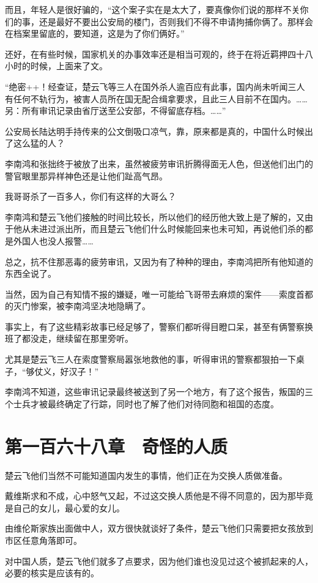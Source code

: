 而且，年轻人是很好骗的，“这个案子实在是太大了，要真像你们说的那样不关你们的事，还是最好不要出公安局的楼门，否则我们不得不申请拘捕你俩了。那样会在档案里留底的，要知道，这是为了你们俩好。”

还好，在有些时候，国家机关的办事效率还是相当可观的，终于在将近羁押四十八小时的时候，上面来了文。

“绝密++！经查证，楚云飞等三人在国外杀人逾百应有此事，国内尚未听闻三人有任何不轨行为，被害人员所在国无配合缉拿要求，且此三人目前不在国内。……另：所有审讯记录由省厅送至公安部，不得留底存档。……”

公安局长陆达明手持传来的公文倒吸口凉气，靠，原来都是真的，中国什么时候出了这么猛的人？

李南鸿和张拙终于被放了出来，虽然被疲劳审讯折腾得面无人色，但送他们出门的警官眼里那异样神色还是让他们趾高气昂。

我哥哥杀了一百多人，你们有这样的大哥么？

李南鸿和楚云飞他们接触的时间比较长，所以他们的经历他大致上是了解的，又由于他从未进过派出所，而且楚云飞他们什么时候能回来也未可知，再说他们杀的都是外国人也没人报警……

总之，抗不住那恶毒的疲劳审讯，又因为有了种种的理由，李南鸿把所有他知道的东西全说了。

当然，因为自己有知情不报的嫌疑，唯一可能给飞哥带去麻烦的案件——索度首都的灭门惨案，被李南鸿坚决地隐瞒了。

事实上，有了这些精彩故事已经足够了，警察们都听得目瞪口呆，甚至有俩警察换班了都没走，继续留在那里旁听。

尤其是楚云飞三人在索度警察局嚣张地救他的事，听得审讯的警察都狠拍一下桌子，“够仗义，好汉子！”

李南鸿不知道，这些审讯记录最终被送到了另一个地方，有了这个报告，叛国的三个士兵才被最终确定了行踪，同时也了解了他们对待同胞和祖国的态度。

\section{第一百六十八章　奇怪的人质}

楚云飞他们当然不可能知道国内发生的事情，他们正在为交换人质做准备。

戴维斯求和不成，心中怒气又起，不过这交换人质他是不得不同意的，因为那毕竟是自己的女儿，最心爱的女儿。

由维伦斯家族出面做中人，双方很快就谈好了条件，楚云飞他们只需要把女孩放到市区任意角落即可。

对中国人质，楚云飞他们就多了点要求，因为他们谁也没见过这个被抓起来的人，必要的核实是应该有的。

